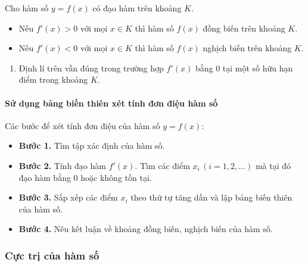     \begin{dn}
        Cho hàm số $y=f(x)$ có đạo hàm trên khoảng $K$.
        \begin{itemize}
            \item  Nếu $f'(x)>0$ với mọi $x \in K$ thì hàm số $f(x)$ đồng biến trên khoảng $K$.
            \item  Nếu $f'(x)<0$ với mọi $x \in K$ thì hàm số $f(x)$ nghịch biến trên khoảng $K$.
        \end{itemize}
    \end{dn}
        \begin{enumerate}[\bf ---]
            \item Định lí trên vẫn đúng trong trường hợp $f'(x)$ bằng $0$ tại một số hữu hạn điểm trong khoảng $K$.
        \end{enumerate}
    \paragraph{Sử dụng bảng biến thiên xét tính đơn điệu hàm số}
    \begin{dn}
        Các bước để xét tính đơn điệu của hàm số $y=f(x)$:
        \begin{itemize}
            \item {\bf Bước 1.} Tìm tập xác định của hàm số.
            \item {\bf Bước 2.} Tính đạo hàm $f'(x)$. Tìm các điểm $x_i\,(i=1,2, \ldots)$ mà tại đó đạo hàm bằng $0$ hoặc không tồn tại.
            \item {\bf Bước 3.} Sắp xếp các điểm $x_i$ theo thứ tự tăng dần và lập bảng biến thiên của hàm số.
            \item {\bf Bước 4.} Nêu kết luận về khoảng đồng biến, nghịch biến của hàm số.
        \end{itemize}
    \end{dn}
    \subsubsection{Cực trị của hàm số}
